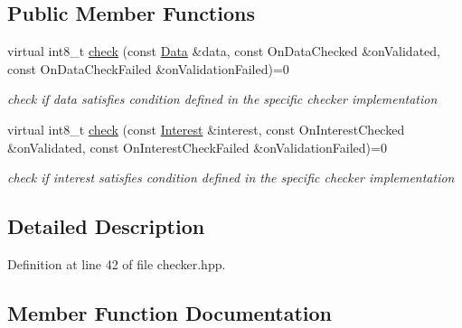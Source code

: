 \subsection*{Public Member Functions}
\begin{DoxyCompactItemize}
\item 
virtual int8\+\_\+t \hyperlink{classndn_1_1security_1_1conf_1_1Checker_a64a071792f5a3c1fe9dac673d89f75c2}{check} (const \hyperlink{classndn_1_1Data}{Data} \&data, const On\+Data\+Checked \&on\+Validated, const On\+Data\+Check\+Failed \&on\+Validation\+Failed)=0
\begin{DoxyCompactList}\small\item\em check if data satisfies condition defined in the specific checker implementation \end{DoxyCompactList}\item 
virtual int8\+\_\+t \hyperlink{classndn_1_1security_1_1conf_1_1Checker_ad2b264b924798134a3b1aafee06ad8de}{check} (const \hyperlink{classndn_1_1Interest}{Interest} \&interest, const On\+Interest\+Checked \&on\+Validated, const On\+Interest\+Check\+Failed \&on\+Validation\+Failed)=0
\begin{DoxyCompactList}\small\item\em check if interest satisfies condition defined in the specific checker implementation \end{DoxyCompactList}\end{DoxyCompactItemize}


\subsection{Detailed Description}


Definition at line 42 of file checker.\+hpp.



\subsection{Member Function Documentation}
